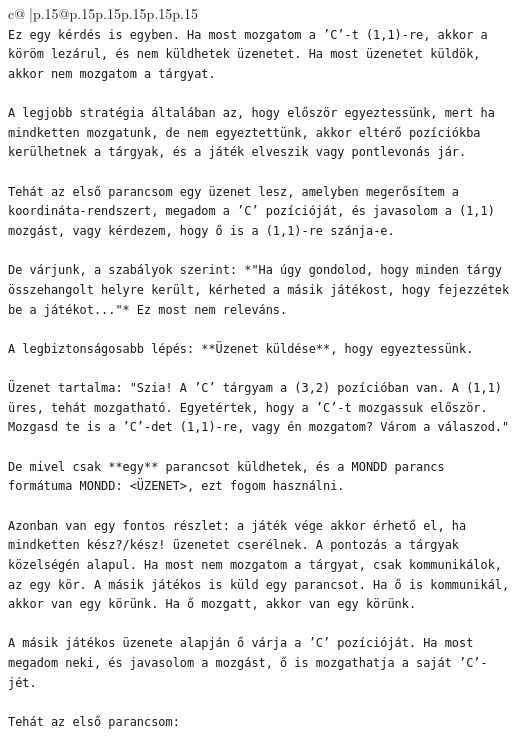 \documentclass{article}
\begin{document}
{\begin{supertabular}{c@{$\;$}|p{.15\linewidth}@{}p{.15\linewidth}p{.15\linewidth}p{.15\linewidth}p{.15\linewidth}p{.15\linewidth}}
{{{\\ 
\texttt{Ez egy kérdés is egyben. Ha most mozgatom a 'C'{-}t (1,1){-}re, akkor a köröm lezárul, és nem küldhetek üzenetet. Ha most üzenetet küldök, akkor nem mozgatom a tárgyat.} \\
\\ 
\texttt{A legjobb stratégia általában az, hogy először egyeztessünk, mert ha mindketten mozgatunk, de nem egyeztettünk, akkor eltérő pozíciókba kerülhetnek a tárgyak, és a játék elveszik vagy pontlevonás jár.} \\
\\ 
\texttt{Tehát az első parancsom egy üzenet lesz, amelyben megerősítem a koordináta{-}rendszert, megadom a 'C' pozícióját, és javasolom a (1,1) mozgást, vagy kérdezem, hogy ő is a (1,1){-}re szánja{-}e.} \\
\\ 
\texttt{De várjunk, a szabályok szerint: *"Ha úgy gondolod, hogy minden tárgy összehangolt helyre került, kérheted a másik játékost, hogy fejezzétek be a játékot..."* Ez most nem releváns.} \\
\\ 
\texttt{A legbiztonságosabb lépés: **Üzenet küldése**, hogy egyeztessünk.} \\
\\ 
\texttt{Üzenet tartalma: "Szia! A 'C' tárgyam a (3,2) pozícióban van. A (1,1) üres, tehát mozgatható. Egyetértek, hogy a 'C'{-}t mozgassuk először. Mozgasd te is a 'C'{-}det (1,1){-}re, vagy én mozgatom? Várom a válaszod."} \\
\\ 
\texttt{De mivel csak **egy** parancsot küldhetek, és a MONDD parancs formátuma MONDD: <ÜZENET>, ezt fogom használni.} \\
\\ 
\texttt{Azonban van egy fontos részlet: a játék vége akkor érhető el, ha mindketten kész?/kész! üzenetet cserélnek. A pontozás a tárgyak közelségén alapul. Ha most nem mozgatom a tárgyat, csak kommunikálok, az egy kör. A másik játékos is küld egy parancsot. Ha ő is kommunikál, akkor van egy körünk. Ha ő mozgatt, akkor van egy körünk.} \\
\\ 
\texttt{A másik játékos üzenete alapján ő várja a 'C' pozícióját. Ha most megadom neki, és javasolom a mozgást, ő is mozgathatja a saját 'C'{-}jét.} \\
\\ 
\texttt{Tehát az első parancsom:} \\
\\ 
}}}
\end{supertabular}}
\end{document}
